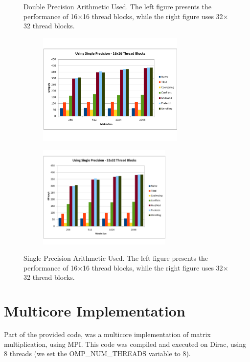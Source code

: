 \documentclass[paper=a4, fontsize=11pt]{scrartcl} %
\numberwithin{equation}{section} %
\numberwithin{figure}{section} %
\numberwithin{table}{section} %
\begin{document}
\begin{figure} [h]
\begin{subfigure}{.5\textwidth}
  \label{fig:all_double_32}
\end{subfigure}
\caption{Double Precision Arithmetic Used. The left figure presents the performance of 16$\times$16 thread blocks, while the right figure uses 32$\times$32 thread blocks.}
\label{fig:multi1}
\end{figure}

\begin{figure} [h]
\centering
\begin{subfigure}{.5\textwidth}
  \centering
  \includegraphics[width=2.85in]{figures/all_Single_16.pdf}
  \label{fig:all_single_16}
\end{subfigure}%
\begin{subfigure}{.5\textwidth}
  \centering
  \includegraphics[width=2.6in]{figures/all_Single_32.pdf}
  \label{fig:all_single_32}
\end{subfigure}
\caption{Single Precision Arithmetic Used. The left figure presents the performance of 16$\times$16 thread blocks, while the right figure uses 32$\times$32 thread blocks.}
\label{fig:multi2}
\end{figure}

\section{\textbf{Multicore Implementation}}
Part of the provided code, was a multicore implementation of matrix multiplication, using MPI. This code was compiled and executed on Dirac, using 8 threads (we set the OMP\_NUM\_THREADS variable to 8).\\
\end{document}
